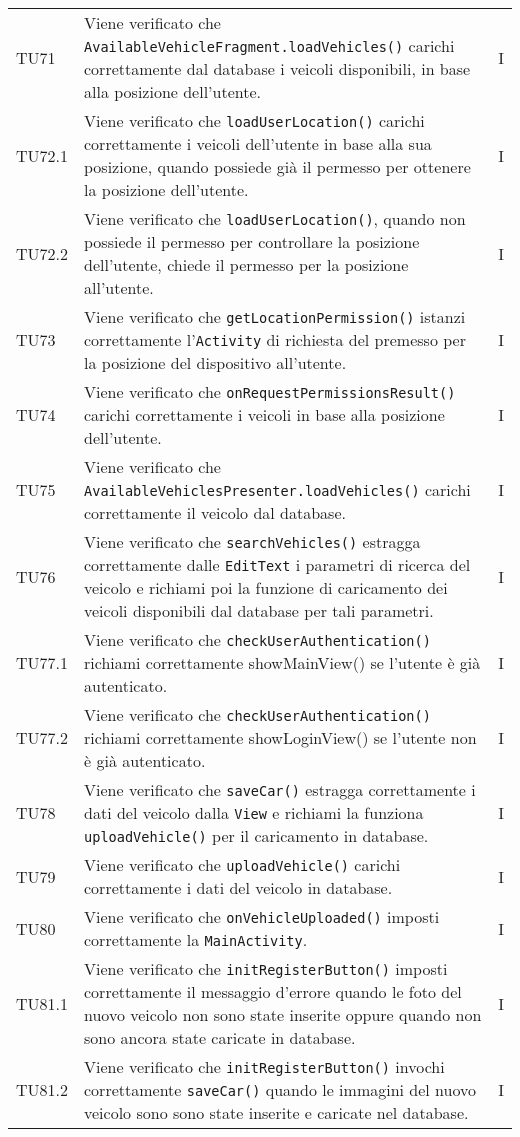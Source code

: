 \begin{longtable}{ >{\centering}p{}  >{\centering}p{} >{\centering}p{}
			}
		TU71 & Viene verificato che \texttt{AvailableVehicleFragment.loadVehicles()} carichi correttamente dal database i veicoli disponibili, in base alla posizione dell'utente. & I 
		\tabularnewline	
		TU72.1 & Viene verificato che \texttt{loadUserLocation()} carichi correttamente i veicoli dell'utente in base alla sua posizione, quando possiede già il permesso per ottenere la posizione dell'utente. & I 
		\tabularnewline	
		TU72.2 & Viene verificato che \texttt{loadUserLocation()}, quando non possiede il permesso per controllare la posizione dell'utente, chiede il permesso per la posizione all'utente. & I 
		\tabularnewline	
		TU73 & Viene verificato che \texttt{getLocationPermission()} istanzi correttamente l'\texttt{Activity} di richiesta del premesso per la posizione del dispositivo all'utente. & I 
		\tabularnewline	
		TU74 & Viene verificato che \texttt{onRequestPermissionsResult()} carichi correttamente i veicoli in base alla posizione dell'utente. & I 
		\tabularnewline	
		TU75 & Viene verificato che \texttt{AvailableVehiclesPresenter.loadVehicles()} carichi correttamente il veicolo dal database. & I 
		\tabularnewline	
		TU76 & Viene verificato che \texttt{searchVehicles()} estragga correttamente dalle \texttt{EditText} i parametri di ricerca del veicolo e richiami poi la funzione di caricamento dei veicoli disponibili dal database per tali parametri. & I 
		\tabularnewline	
		TU77.1 & Viene verificato che \texttt{checkUserAuthentication()} richiami correttamente showMainView() se l'utente è già autenticato. & I 
		\tabularnewline	
		TU77.2 & Viene verificato che \texttt{checkUserAuthentication()} richiami correttamente showLoginView() se l'utente non è già autenticato. & I 
		\tabularnewline	
		TU78 & Viene verificato che \texttt{saveCar()} estragga correttamente i dati del veicolo dalla \texttt{View} e richiami la funziona \texttt{uploadVehicle()} per il caricamento in database. & I 
		\tabularnewline	
		TU79 & Viene verificato che \texttt{uploadVehicle()} carichi correttamente i dati del veicolo in database. & I 
		\tabularnewline	
		TU80 & Viene verificato che \texttt{onVehicleUploaded()} imposti correttamente la \texttt{MainActivity}. & I 
		\tabularnewline	
		TU81.1 & Viene verificato che \texttt{initRegisterButton()} imposti correttamente il messaggio d'errore quando le foto del nuovo veicolo non sono state inserite oppure quando non sono ancora state caricate in database. & I
		\tabularnewline	
		TU81.2 & Viene verificato che \texttt{initRegisterButton()} invochi correttamente \texttt{saveCar()} quando le immagini del nuovo veicolo sono sono state inserite e caricate nel database. & I 

\end{longtable}
